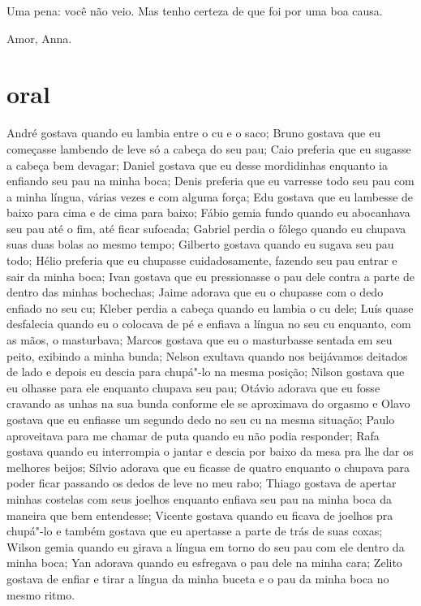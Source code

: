 Uma pena: você não veio. Mas tenho certeza de que foi por uma boa causa.



 \begin{flushright}Amor, Anna.\end{flushright}


\chapter{ oral }

André gostava quando eu lambia entre o cu e o saco; Bruno gostava que eu
começasse lambendo de leve só a cabeça do seu pau; Caio preferia que eu
sugasse a cabeça bem devagar; Daniel gostava que eu desse mordidinhas
enquanto ia enfiando seu pau na minha boca; Denis preferia que eu
varresse todo seu pau com a minha língua, várias vezes e com alguma
força; Edu gostava que eu lambesse de baixo para cima e de cima para
baixo; Fábio gemia fundo quando eu abocanhava seu pau até o fim, até
ficar sufocada; Gabriel perdia o fôlego quando eu chupava suas duas
bolas ao mesmo tempo; Gilberto gostava quando eu sugava seu pau todo;
Hélio preferia que eu chupasse cuidadosamente, fazendo seu pau entrar e
sair da minha boca; Ivan gostava que eu pressionasse o pau dele contra a
parte de dentro das minhas bochechas; Jaime adorava que eu o chupasse
com o dedo enfiado no seu cu; Kleber perdia a cabeça quando eu lambia o
cu dele; Luís quase desfalecia quando eu o colocava de pé e enfiava a
língua no seu cu enquanto, com as mãos, o masturbava; Marcos gostava que
eu o masturbasse sentada em seu peito, exibindo a minha bunda; Nelson
exultava quando nos beijávamos deitados de lado e depois eu descia para
chupá"-lo na mesma posição; Nilson gostava que eu olhasse para ele
enquanto chupava seu pau; Otávio adorava que eu fosse cravando as unhas
na sua bunda conforme ele se aproximava do orgasmo e Olavo gostava que
eu enfiasse um segundo dedo no seu cu na mesma situação; Paulo
aproveitava para me chamar de puta quando eu não podia responder; Rafa
gostava quando eu interrompia o jantar e descia por baixo da mesa pra
lhe dar os melhores beijos; Sílvio adorava que eu ficasse de quatro
enquanto o chupava para poder ficar passando os dedos de leve no meu
rabo; Thiago gostava de apertar minhas costelas com seus joelhos
enquanto enfiava seu pau na minha boca da maneira que bem entendesse;
Vicente gostava quando eu ficava de joelhos pra chupá"-lo e também
gostava que eu apertasse a parte de trás de suas coxas; Wilson gemia
quando eu girava a língua em torno do seu pau com ele dentro da minha
boca; Yan adorava quando eu esfregava o pau dele na minha cara; Zelito
gostava de enfiar e tirar a língua da minha buceta e o pau da minha boca
no mesmo ritmo.

